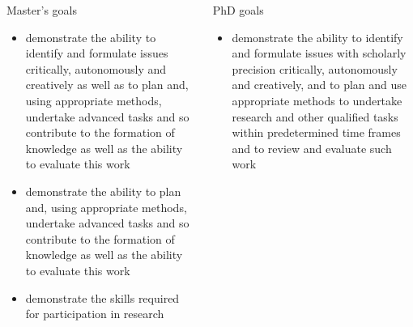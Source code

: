 \begin{frame}[fragile]
  \footnotesize
  \begin{columns}[t]
    \begin{column}{0.5\columnwidth}
      \begin{block}{Master's goals~\cite{HEO2}}
        \begin{itemize}
          \item demonstrate the ability to identify and formulate issues 
            critically, autonomously and creatively as well as to plan and, 
            using appropriate methods, undertake advanced tasks \textelp{} and 
            so contribute to the formation of knowledge as well as the ability 
            to evaluate this work
          \item demonstrate the ability \textelp{} to plan and, using 
            appropriate methods, undertake advanced tasks \textelp{} and so 
            contribute to the formation of knowledge as well as the ability to 
            evaluate this work
          \item demonstrate the skills required for participation in research
            \textelp{}
        \end{itemize}
      \end{block}
    \end{column}
    \begin{column}{0.5\columnwidth}
      \begin{block}{PhD goals~\cite{HEO2}}
        \begin{itemize}
          \item demonstrate the ability to identify and formulate issues with 
            scholarly precision critically, autonomously and creatively, and to 
            plan and use appropriate methods to undertake research and other 
            qualified tasks within predetermined time frames and to review and 
            evaluate such work
        \end{itemize}
      \end{block}
    \end{column}
  \end{columns}
\end{frame}

